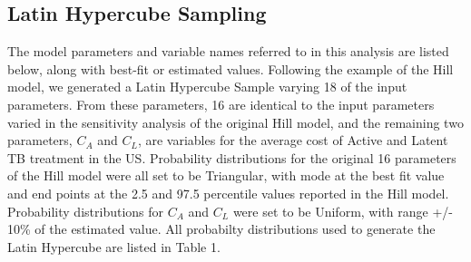 \documentclass{amsart}
\begin{document}
\subsection{Latin Hypercube Sampling}
The model parameters and variable names referred to in this analysis are listed below, along with best-fit or estimated values.  Following the example of the Hill model, we generated a Latin Hypercube Sample varying 18 of the input parameters.  From these parameters, 16 are identical to the input parameters varied in the sensitivity analysis of the original Hill model, and the remaining two parameters, $C_{A}$ and $C_{L}$, are variables for the average cost of Active and Latent TB treatment in the US.   Probability distributions for the original 16 parameters of the Hill model were all set to be Triangular, with mode at the best fit value and end points at the 2.5 and 97.5 percentile values reported in the Hill model.  Probability distributions for $C_{A}$ and $C_{L}$ were set to be Uniform, with range +/- 10\% of the estimated value.  All probabilty distributions used to generate the Latin Hypercube are listed in Table 1.\\
\end{document}
